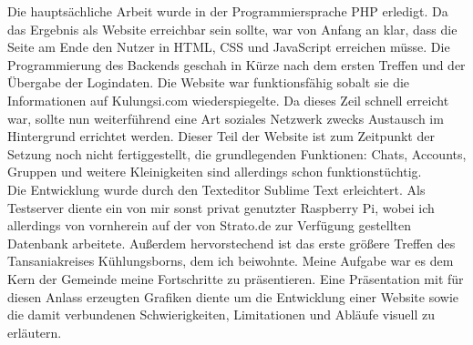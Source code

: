 Die hauptsächliche Arbeit wurde in der Programmiersprache PHP erledigt.
Da das Ergebnis als Website erreichbar sein sollte,
war von Anfang an klar, dass die Seite am Ende den Nutzer in HTML, CSS und JavaScript
erreichen müsse.
Die Programmierung des Backends geschah in Kürze nach dem ersten Treffen und der Übergabe der Logindaten.
Die Website war funktionsfähig sobalt sie die Informationen auf Kulungsi.com wiederspiegelte.
Da dieses Zeil schnell erreicht war, sollte nun weiterführend eine Art soziales Netzwerk zwecks Austausch im Hintergrund errichtet werden.
Dieser Teil der Website ist zum Zeitpunkt der Setzung noch nicht fertiggestellt, die grundlegenden
Funktionen: Chats, Accounts, Gruppen und weitere Kleinigkeiten sind allerdings schon funktionstüchtig.\\
Die Entwicklung wurde durch den Texteditor Sublime Text erleichtert. Als Testserver diente ein von mir sonst privat genutzter Raspberry Pi,
wobei ich allerdings von vornherein auf der von Strato.de zur Verfügung gestellten Datenbank arbeitete.
Außerdem hervorstechend ist das erste größere Treffen des Tansaniakreises Kühlungsborns, dem ich beiwohnte.
Meine Aufgabe war es dem Kern der Gemeinde meine Fortschritte zu präsentieren.
Eine Präsentation mit für diesen Anlass erzeugten Grafiken diente um die Entwicklung einer Website
sowie die damit verbundenen Schwierigkeiten, Limitationen und Abläufe visuell zu erläutern.


